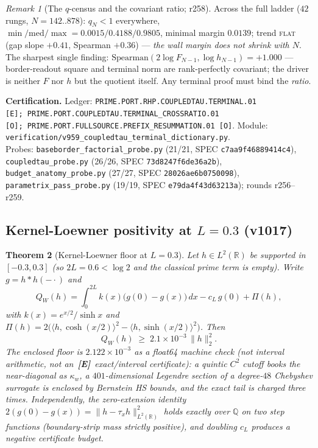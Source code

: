 \documentclass[11pt]{article}
\newcommand{\mE}{\textcolor{certgreen}{\textbf{[E]}}}
\newcommand{\certbox}[3]{%
  \par\medskip\noindent\colorbox{certgray}{\parbox{\dimexpr\linewidth-2\fboxsep}{%
    \footnotesize\raggedright\textbf{Certification.} Ledger: \texttt{#1}.\quad
    Module: \texttt{#2}.\\ #3}}\par\medskip}
\newtheorem{theorem}{Theorem}[section]
\theoremstyle{definition}
\theoremstyle{remark}
\newtheorem{remark}[theorem]{Remark}
\begin{document}
\begin{remark}[The $q$-census and the covariant ratio; r258]
Across the full ladder ($42$ rungs, $N=142..878$): $q_N<1$ everywhere,
$\min/\mathrm{med}/\max=0.0015/0.4188/0.9805$, minimal margin $0.0139$;
trend \textsc{flat} (gap slope $+0.41$, Spearman $+0.36$) --- \emph{the
wall margin does not shrink with $N$}.  The sharpest single finding:
$\mathrm{Spearman}(2\log F_{N-1},\log h_{N-1})=+1.000$ --- border-readout
square and terminal norm are rank-perfectly covariant; the driver is
neither $F$ nor $h$ but the quotient itself.  Any terminal proof must bind
the \emph{ratio}.
\end{remark}

\certbox{PRIME.PORT.RHP.COUPLEDTAU.TERMINAL.01 [E];\
PRIME.PORT.COUPLEDTAU.TERMINAL\_CROSSRATIO.01 [O];\
PRIME.PORT.FULLSOURCE.PREFIX\_RESUMMATION.01 [O]}%
{verification/v959\_coupledtau\_terminal\_dictionary.py}%
{Probes: \texttt{baseborder\_factorial\_probe.py} (21/21, SPEC \texttt{c7aa9f46889414c4}),
\texttt{coupledtau\_probe.py} (26/26, SPEC \texttt{73d8247f6de36a2b}),
\texttt{budget\_anatomy\_probe.py} (27/27, SPEC \texttt{28026ae6b0750098}),
\texttt{parametrix\_pass\_probe.py} (19/19, SPEC \texttt{e79da4f43d63213a});
rounds r256--r259.}

\subsection{Kernel-Loewner positivity at $L=0.3$ (v1017)}

\begin{theorem}[Kernel-Loewner floor at $L=0.3$]\label{thm:kernel-loewner-03}
Let $h\in L^2(\mathbb R)$ be supported in $[-0.3,0.3]$ (so $2L=0.6<\log 2$ and
the classical prime term is empty).  Write $g=h*h(-{\cdot})$ and
\[
  Q_W(h)=\int_0^{2L} k(x)\bigl(g(0)-g(x)\bigr)\,dx - c_L\,g(0)+\Pi(h),
\]
with $k(x)=e^{x/2}/\sinh x$ and
$\Pi(h)=2\bigl(\langle h,\cosh(x/2)\rangle^2-\langle h,\sinh(x/2)\rangle^2\bigr)$.
Then
\[
  Q_W(h)\;\ge\; 2.1{\times}10^{-3}\,\|h\|_2^2.
\]
The enclosed floor is $2.122{\times}10^{-3}$ as a \emph{float64}
machine check (not interval arithmetic, not an~\mE\ exact/interval
certificate): a quintic $C^2$ cutoff books the
near-diagonal as $\kappa_w$, a $401$-dimensional Legendre section of a
degree-$48$ Chebyshev surrogate is enclosed by Bernstein HS bounds, and the
exact tail is charged three times.  Independently, the zero-extension identity
$2(g(0)-g(x))=\|h-\tau_x h\|_{L^2(\mathbb R)}^2$ holds exactly over $\mathbb Q$
on two step functions (boundary-strip mass strictly positive), and doubling
$c_L$ produces a negative certificate budget.
\end{theorem}
\end{document}
